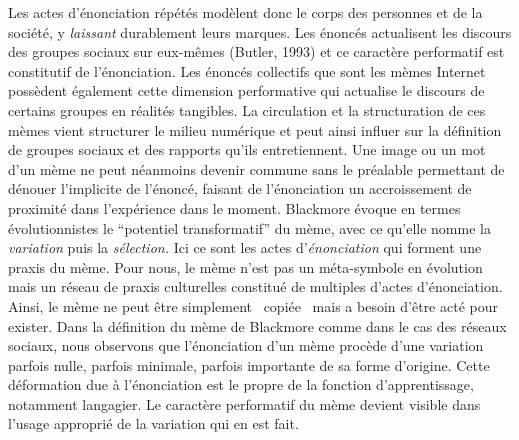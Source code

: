 {{\color[rgb]{0.12156863,0.28627452,0.49019608}
Les actes d{\textquoteright}\'enonciation r\'ep\'et\'es mod\`elent donc
le corps des personnes et de la soci\'et\'e, y \textit{laissant
}durablement leurs marques. Les \'enonc\'es actualisent les discours
des groupes sociaux sur eux-m\^emes (Butler, 1993) et ce caract\`ere
performatif est constitutif de l{\textquoteright}\'enonciation. Les
\'enonc\'es collectifs que sont les m\`emes Internet poss\`edent
\'egalement cette dimension performative qui actualise le discours de
certains groupes en r\'ealit\'es tangibles. La circulation et la
structuration de ces m\`emes vient structurer le milieu num\'erique et
peut ainsi influer sur la d\'efinition de groupes sociaux et des
rapports qu{\textquoteright}ils entretiennent. Une image ou un mot
d{\textquoteright}un m\`eme ne peut n\'eanmoins devenir commune sans le
pr\'ealable permettant de d\'enouer l{\textquoteright}implicite de
l{\textquoteright}\'enonc\'e, faisant de
l{\textquoteright}\'enonciation un accroissement de proximit\'e dans
l{\textquoteright}exp\'erience dans le moment. Blackmore \'evoque en
termes \'evolutionnistes le {\textquotedblleft}potentiel
transformatif{\textquotedblright} du m\`eme, avec ce
qu{\textquoteright}elle nomme la \textit{variation} puis la
\textit{s\'election. }Ici ce sont les actes
d{\textquoteright}\textit{\'enonciation} qui forment une praxis du
m\`eme. Pour nous, le m\`eme n{\textquoteright}est pas un
m\'eta-symbole en \'evolution mais un r\'eseau de praxis culturelles
constitu\'e de multiples d{\textquoteright}actes
d{\textquoteright}\'enonciation. Ainsi, le m\`eme ne peut \^etre
simplement {\guillemotleft}~copi\'ee~{\guillemotright} mais a besoin
d{\textquoteright}\^etre act\'e pour exister. Dans la d\'efinition du
m\`eme de Blackmore comme dans le cas des r\'eseaux sociaux, nous
observons que l{\textquoteright}\'enonciation d{\textquoteright}un
m\`eme proc\`ede d{\textquoteright}une variation parfois nulle, parfois
minimale, parfois importante de sa forme d{\textquoteright}origine.
Cette d\'eformation due \`a l{\textquoteright}\'enonciation est le
propre de la fonction d{\textquoteright}apprentissage, notamment
langagier. Le caract\`ere performatif du m\`eme devient visible dans
l{\textquoteright}usage appropri\'e de la variation qui en est fait.

}}
